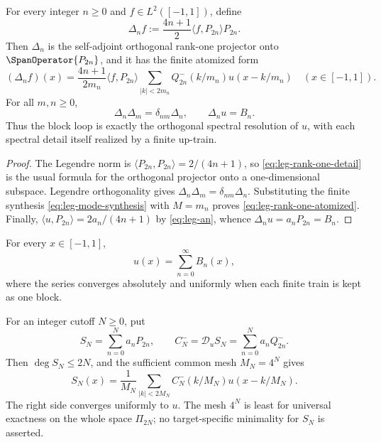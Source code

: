 \begin{theorem}
\label{thm:leg-rank-one-details}
For every integer $n\ge0$ and $f\in L^2([-1,1])$, define
\begin{equation}
 \Delta_nf:=\frac{4n+1}{2}\langle f,P_{2n}\rangle P_{2n}.
 \label{eq:leg-rank-one-detail}
\end{equation}
Then $\Delta_n$ is the self-adjoint orthogonal rank-one projector onto
$\SpanOperator\{P_{2n}\}$, and it has the finite atomized form
\begin{equation}
 \boxed{
 (\Delta_nf)(x)=\frac{4n+1}{2m_n}\langle f,P_{2n}\rangle
 \sum_{|k|<2m_n}Q_{2n}^-(k/m_n)u(x-k/m_n)}
 \quad(x\in[-1,1]).
 \label{eq:leg-rank-one-atomized}
\end{equation}
For all $m,n\ge0$,
\begin{equation}
 \boxed{\Delta_n\Delta_m=\delta_{nm}\Delta_n,
 \qquad \Delta_nu=B_n.}
 \label{eq:leg-rank-one-calculus}
\end{equation}
Thus the block loop is exactly the orthogonal spectral resolution of $u$,
with each spectral detail itself realized by a finite up-train.
\end{theorem}

\begin{proof}
The Legendre norm is
$\langle P_{2n},P_{2n}\rangle=2/(4n+1)$, so
\eqref{eq:leg-rank-one-detail} is the usual formula for the orthogonal
projector onto a one-dimensional subspace.  Legendre orthogonality gives
$\Delta_n\Delta_m=\delta_{nm}\Delta_n$.  Substituting the finite synthesis
\eqref{eq:leg-mode-synthesis} with $M=m_n$ proves
\eqref{eq:leg-rank-one-atomized}.  Finally,
$\langle u,P_{2n}\rangle=2a_n/(4n+1)$ by \eqref{eq:leg-an}, whence
$\Delta_nu=a_nP_{2n}=B_n$.
\end{proof}

\begin{theorem}
\label{thm:leg-block-loop}
For every $x\in[-1,1]$,
\begin{equation}
 \boxed{u(x)=\sum_{n=0}^{\infty}B_n(x),}
 \label{eq:leg-block-loop}
\end{equation}
where the series converges absolutely and uniformly when each finite train is
kept as one block.

For an integer cutoff $N\ge0$, put
\begin{equation}
 S_N=\sum_{n=0}^{N}a_nP_{2n},\qquad
 C_N^-=\mathscr D_uS_N=\sum_{n=0}^{N}a_nQ_{2n}^-.
 \label{eq:leg-SN-CN}
\end{equation}
Then $\deg S_N\le2N$, and the sufficient common mesh $M_N=4^N$ gives
\begin{equation}
 \boxed{
 S_N(x)=\frac1{M_N}\sum_{|k|<2M_N}
 C_N^-(k/M_N)u(x-k/M_N).}
 \label{eq:leg-common-mesh}
\end{equation}
The right side converges uniformly to $u$.  The mesh $4^N$ is least for
universal exactness on the whole space $\Pi_{2N}$; no target-specific
minimality for $S_N$ is asserted.
\end{theorem}

